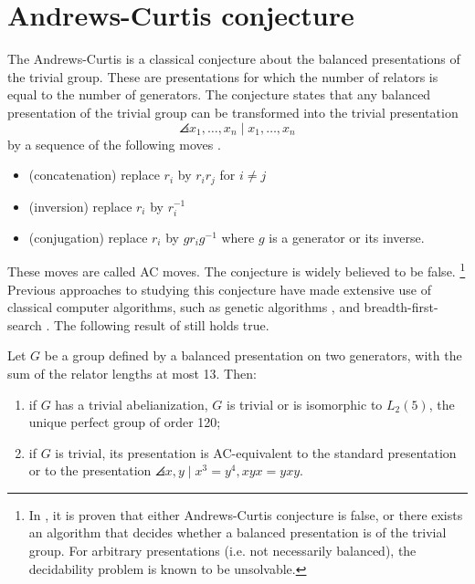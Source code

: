 
\section{Andrews-Curtis conjecture\label{sec:AC}}

The Andrews-Curtis is a classical conjecture about the balanced presentations
of the trivial group.
These are presentations for which the number of relators is
equal to the number of generators.
The conjecture states that any balanced presentation of the trivial group can be transformed into the trivial presentation
\[
\angles{x_1, \dots, x_n \mid x_1, \dots, x_n}
\]
by a sequence of the following moves \cite{Andrews-Curtis}.

\begin{itemize}
	\item (concatenation) replace $r_i$ by $r_i r_j$ for $i \neq j$
	\item (inversion) replace $r_i$ by $r_i^{-1}$
	\item (conjugation) replace $r_i$ by $g r_i g^{-1}$ where $g$ is a generator or its inverse.
\end{itemize}

These moves are called AC moves.
The conjecture is widely believed to be false.
\footnote{In \cite{decidability}, it is proven that either Andrews-Curtis conjecture is false, or there exists an algorithm that decides whether a balanced presentation is of the trivial group.
For arbitrary presentations (i.e. not necessarily balanced), the decidability problem is known to be unsolvable.
}
Previous approaches to studying this conjecture have made extensive use of classical computer algorithms, such as genetic algorithms \cite{genetic}, and breadth-first-search  \cite{bfs-ac}.
The following result of \cite{bfs-ac} still holds true.

\begin{theorem}
	Let $G$ be a group defined by a balanced presentation on two generators, with the sum
	of the relator lengths at most 13.
	Then:
	\begin{enumerate}[label=(\roman*)]
		\item if $G$ has a trivial abelianization, $G$ is trivial or is isomorphic to $L_2(5)$, the unique perfect
		group of order 120;
		\item if $G$ is trivial, its presentation is AC-equivalent to the standard presentation or to the presentation
		$\angles{x, y \mid x^3 = y^4, xyx = yxy}$.
	\end{enumerate}
\end{theorem}

